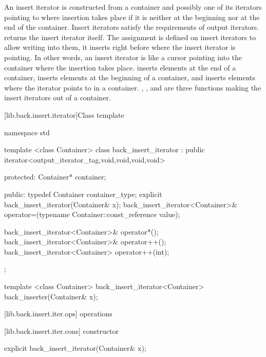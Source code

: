 \pnum
An insert iterator is constructed from a container and possibly one of its iterators pointing to where
insertion takes place if it is neither at the beginning nor at the end of the container.
Insert iterators satisfy the requirements of output iterators.
returns the insert iterator itself.
The assignment
is defined on insert iterators to allow writing into them, it inserts
right before where the insert iterator is pointing.
In other words, an insert iterator is like a cursor pointing into the
container where the insertion takes place.
inserts elements at the end of a container,
inserts elements at the beginning of a container, and
inserts elements where the iterator points to in a container.
,
,
and
are three
functions making the insert iterators out of a container.

[lib.back.insert.iterator]{Class template }

%
\begin{codeblock}
namespace std {
  template <class Container>
  class back_insert_iterator :
        public iterator<output_iterator_tag,void,void,void,void> {
  protected:
    Container* container;

  public:
    typedef Container container_type;
    explicit back_insert_iterator(Container& x);
    back_insert_iterator<Container>&
      operator=(typename Container::const_reference value);

    back_insert_iterator<Container>& operator*();
    back_insert_iterator<Container>& operator++();
    back_insert_iterator<Container>  operator++(int);
  };

  template <class Container>
    back_insert_iterator<Container> back_inserter(Container& x);
}
\end{codeblock}

[lib.back.insert.iter.ops]{ operations}

[lib.back.insert.iter.cons]{ constructor}

%
\begin{itemdecl}
explicit back_insert_iterator(Container& x);
\end{itemdecl}

